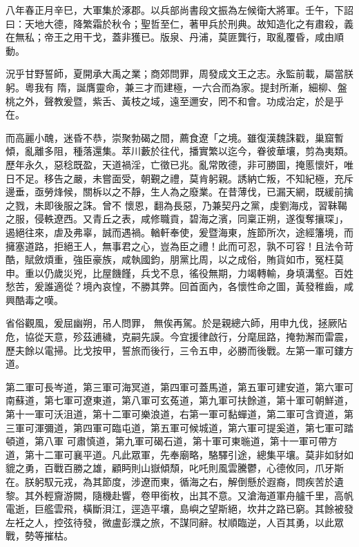
\begin{pinyinscope}

 八年春正月辛巳，大軍集於涿郡。以兵部尚書段文振為左候衛大將軍。壬午，下詔曰：天地大德，降繁霜於秋令；聖哲至仁，著甲兵於刑典。故知造化之有肅殺，義在無私；帝王之用干戈，蓋非獲已。版泉、丹浦，莫匪龔行，取亂覆昏，咸由順動。



 況乎甘野誓師，夏開承大禹之業；商郊問罪，周發成文王之志。永監前載，屬當朕躬。粵我有
 隋，誕膺靈命，兼三才而建極，一六合而為家。提封所漸，細柳、盤桃之外，聲教爰暨，紫舌、黃枝之域，遠至邇安，罔不和會。功成治定，於是乎在。



 而高麗小醜，迷昏不恭，崇聚勃碣之間，薦食遼「之境。雖復漢魏誅戳，巢窟暫傾，亂離多阻，種落還集。萃川藪於往代，播實繁以迄今，眷彼華壤，剪為夷類。歷年永久，惡稔既盈，天道禍淫，亡徵已兆。亂常敗德，非可勝圖，掩慝懷奸，唯日不足。移告之嚴，未嘗面受，朝覲之禮，莫肯躬親。誘納亡叛，不知紀極，充斥邊垂，亟勞烽候，關柝以之不靜，生人為之廢業。在昔薄伐，已漏天網，既緩前擒之戮，未即後服之誅。曾不
 懷恩，翻為長惡，乃兼契丹之黨，虔劉海戍，習靺鞨之服，侵軼遼西。又青丘之表，咸修職貢，碧海之濱，同稟正朔，遂復奪攘琛」，遏絕往來，虐及弗辜，誠而遇禍。輶軒奉使，爰暨海東，旌節所次，途經籓境，而擁塞道路，拒絕王人，無事君之心，豈為臣之禮！此而可忍，孰不可容！且法令苛酷，賦斂煩重，強臣豪族，咸執國鈞，朋黨比周，以之成俗，賄貨如市，冤枉莫申。重以仍歲災兇，比屋饑饉，兵戈不息，徭役無期，力竭轉輸，身填溝壑。百姓愁苦，爰誰適從？境內哀惶，不勝其弊。回首面內，各懷性命之圖，黃發稚齒，咸興酷毒之嘆。



 省俗觀風，爰屈幽朔，吊人問罪，
 無俟再駕。於是親總六師，用申九伐，拯厥阽危，協從天意，殄茲逋穢，克嗣先謨。今宜援律啟行，分麾屈路，掩勃澥而雷震，歷夫餘以電掃。比戈按甲，誓旅而後行，三令五申，必勝而後戰。左第一軍可鏤方道。



 第二軍可長岑道，第三軍可海冥道，第四軍可蓋馬道，第五軍可建安道，第六軍可南蘇道，第七軍可遼東道，第八軍可玄菟道，第九軍可扶餘道，第十軍可朝鮮道，第十一軍可沃沮道，第十二軍可樂浪道，右第一軍可黏蟬道，第二軍可含資道，第三軍可渾彌道，第四軍可臨屯道，第五軍可候城道，第六軍可提奚道，第七軍可踏頓道，第八軍
 可肅慎道，第九軍可碣石道，第十軍可東暆道，第十一軍可帶方道，第十二軍可襄平道。凡此眾軍，先奉廟略，駱驛引途，總集平壤。莫非如豺如貔之勇，百戰百勝之雄，顧眄則山嶽傾頹，叱吒則風雲騰鬱，心德攸同，爪牙斯在。朕躬馭元戎，為其節度，涉遼而東，循海之右，解倒懸於遐裔，問疾苦於遺黎。其外輕齎游闕，隨機赴響，卷甲銜枚，出其不意。又滄海道軍舟艫千里，高帆電逝，巨艦雲飛，橫斷浿江，逕造平壤，島嶼之望斯絕，坎井之路已窮。其餘被發左衽之人，控弦待發，微盧彭濮之旅，不謀同辭。杖順臨逆，人百其勇，以此眾戰，勢等摧枯。




\end{pinyinscope}
